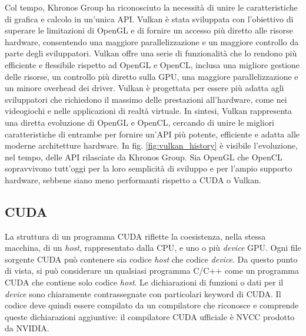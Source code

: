 Col tempo, Khronos Group ha riconosciuto la necessità di unire le caratteristiche di grafica e calcolo in un'unica \gls{API}. Vulkan è stata sviluppata con l'obiettivo di superare le limitazioni di OpenGL e di fornire un accesso più diretto alle risorse hardware, consentendo una maggiore parallelizzazione e un maggiore controllo da parte degli sviluppatori. Vulkan offre una serie di funzionalità che lo rendono più efficiente e flessibile rispetto ad OpenGL e OpenCL, inclusa una migliore gestione delle risorse, un controllo più diretto sulla \gls{GPU}, una maggiore parallelizzazione e un minore overhead dei driver. Vulkan è progettata per essere più adatta agli sviluppatori che richiedono il massimo delle prestazioni all'hardware, come nei videogiochi e nelle applicazioni di realtà virtuale. In sintesi, Vulkan rappresenta una diretta evoluzione di OpenGL e OpenCL, cercando di unire le migliori caratteristiche di entrambe per fornire un'\gls{API} più potente, efficiente e adatta alle moderne architetture hardware. In fig. \ref{fig:vulkan_history} è visibile l'evoluzione, nel tempo, delle \gls{API} rilasciate da Khronos Group. Sia OpenGL che OpenCL sopravvivono tutt'oggi per la loro semplicità di sviluppo e per l'ampio supporto hardware, sebbene siano meno performanti rispetto a \gls{CUDA} o Vulkan.

\subsection[CUDA]{CUDA}

La struttura di un programma \gls{CUDA} riflette la coesistenza, nella stessa macchina, di un \textit{host}, rappresentato dalla \gls{CPU}, e uno o più \textit{device} \gls{GPU}. Ogni file sorgente \gls{CUDA} può contenere sia codice \textit{host} che codice \textit{device}. Da questo punto di vista, si può considerare un qualsiasi programma C/C++ come un programma \gls{CUDA} che contiene solo codice \textit{host}. Le dichiarazioni di funzioni o dati per il \textit{device} sono chiaramente contrassegnate con particolari keyword di \gls{CUDA}. Il codice deve quindi essere compilato da un compilatore che riconosce e comprende queste dichiarazioni aggiuntive: il compilatore \gls{CUDA} ufficiale è \gls{NVCC} prodotto da NVIDIA.

